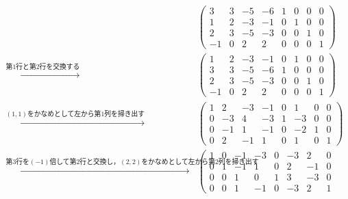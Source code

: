 \begin{tanswer}
  \begin{align*}
                                                                            &
    \left(
    \begin{array}{cccc|cccc}
        3  & 3 & -5 & -6 & 1 & 0 & 0 & 0 \\
        1  & 2 & -3 & -1 & 0 & 1 & 0 & 0 \\
        2  & 3 & -5 & -3 & 0 & 0 & 1 & 0 \\
        -1 & 0 & 2  & 2  & 0 & 0 & 0 & 1
      \end{array}
    \right)                                                                   \\
    \xrightarrow{\text{第$1$行と第$2$行を交換する}}                                   &
    \left( \begin{array}{cccc|cccc}
               1  & 2 & -3 & -1 & 0 & 1 & 0 & 0 \\
               3  & 3 & -5 & -6 & 1 & 0 & 0 & 0 \\
               2  & 3 & -5 & -3 & 0 & 0 & 1 & 0 \\
               -1 & 0 & 2  & 2  & 0 & 0 & 0 & 1
             \end{array}
    \right)                                                                   \\
    \xrightarrow{\text{$(1,1)$をかなめとして左から第1列を掃き出す}}                          &
    \left( \begin{array}{cccc|cccc}
               1 & 2  & -3 & -1 & 0 & 1  & 0 & 0 \\
               0 & -3 & 4  & -3 & 1 & -3 & 0 & 0 \\
               0 & -1 & 1  & -1 & 0 & -2 & 1 & 0 \\
               0 & 2  & -1 & 1  & 0 & 1  & 0 & 1
             \end{array}
    \right)                                                                   \\
    \xrightarrow{\text{第$3$行を$(-1)$倍して第2行と交換し，$(2,2)$をかなめとして左から第$2$列を掃き出す}} &
    \left( \begin{array}{cccc|cccc}
               1 & 0 & -1 & -3 & 0 & -3 & 2  & 0 \\
               0 & 1 & -1 & 1  & 0 & 2  & -1 & 0 \\
               0 & 0 & 1  & 0  & 1 & 3  & -3 & 0 \\
               0 & 0 & 1  & -1 & 0 & -3 & 2  & 1

\end{array}
\end{align*}
\end{tanswer}
